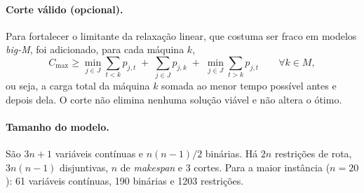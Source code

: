 \paragraph{Corte válido (opcional).} Para fortalecer o limitante da relaxação
linear, que costuma ser fraco em modelos \textit{big-M}, foi adicionado, para
cada máquina $k$,
\begin{equation}
C_{\max} \geq \min_{j \in J} \sum_{t<k} p_{j,t} \;+\; \sum_{j \in J} p_{j,k}
\;+\; \min_{j \in J} \sum_{t>k} p_{j,t}
\qquad \forall k \in M,
\end{equation}
ou seja, a carga total da máquina $k$ somada ao menor tempo possível antes e
depois dela. O corte não elimina nenhuma solução viável e não altera o ótimo.

\paragraph{Tamanho do modelo.} São $3n + 1$ variáveis contínuas e
$n(n-1)/2$ binárias. Há $2n$ restrições de rota, $3n(n-1)$ disjuntivas, $n$
de \textit{makespan} e 3 cortes. Para a maior instância ($n=20$): 61 variáveis
contínuas, 190 binárias e 1203 restrições.
